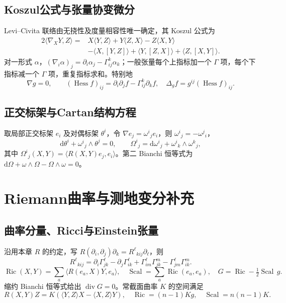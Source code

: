\documentclass[../main.tex]{subfiles}
\begin{document}
\subsection{Koszul公式与张量协变微分}
Levi--Civita 联络由无挠性及度量相容性唯一确定，其 Koszul 公式为
\begin{align*}
2\langle\nabla_XY,Z\rangle={}&X\langle Y,Z\rangle+Y\langle Z,X\rangle-Z\langle X,Y\rangle\\
&-\langle X,[Y,Z]\rangle+\langle Y,[Z,X]\rangle+\langle Z,[X,Y]\rangle.
\end{align*}
对一形式 $\alpha$，$(\nabla_i\alpha)_j=\partial_i\alpha_j-\Gamma^k_{ij}\alpha_k$；一般张量每个上指标加一个 $\Gamma$ 项，每个下指标减一个 $\Gamma$ 项，重复指标求和。特别地
\[
\nabla g=0,\qquad(\operatorname{Hess}f)_{ij}=\partial_i\partial_jf-\Gamma^k_{ij}\partial_kf,
\quad\Delta_gf=g^{ij}(\operatorname{Hess}f)_{ij}.
\]
\subsection{正交标架与Cartan结构方程}
取局部正交标架 $e_i$ 及对偶标架 $\theta^i$，令 $\nabla e_j=\omega^i{}_je_i$，则 $\omega^i{}_j=-\omega^j{}_i$，
\[
\mathrm d\theta^i+\omega^i{}_j\wedge\theta^j=0,\qquad
\Omega^i{}_j=\mathrm d\omega^i{}_j+\omega^i{}_k\wedge\omega^k{}_j,
\]
其中 $\Omega^i{}_j(X,Y)=\langle R(X,Y)e_j,e_i\rangle$。第二 Bianchi 恒等式为 $\mathrm d\Omega+\omega\wedge\Omega-\Omega\wedge\omega=0$。
\section{Riemann曲率与测地变分补充}
\subsection{曲率分量、Ricci与Einstein张量}
沿用本章 $R$ 的约定，写 $R(\partial_i,\partial_j)\partial_k=R^\ell{}_{kij}\partial_\ell$，则
\[
R^\ell{}_{kij}=\partial_i\Gamma^\ell_{jk}-\partial_j\Gamma^\ell_{ik}
+\Gamma^\ell_{im}\Gamma^m_{jk}-\Gamma^\ell_{jm}\Gamma^m_{ik}.
\]
\[
\operatorname{Ric}(X,Y)=\sum_a\langle R(e_a,X)Y,e_a\rangle,\quad
\operatorname{Scal}=\sum_a\operatorname{Ric}(e_a,e_a),\quad
G=\operatorname{Ric}-\tfrac12\operatorname{Scal}\,g.
\]
缩约 Bianchi 恒等式给出 $\operatorname{div}G=0$。常截面曲率 $K$ 的空间满足
\[
R(X,Y)Z=K(\langle Y,Z\rangle X-\langle X,Z\rangle Y),\quad
\operatorname{Ric}=(n-1)Kg,\quad\operatorname{Scal}=n(n-1)K.
\]
\end{document}
